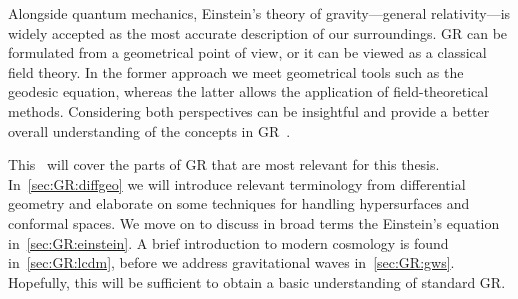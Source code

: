 













Alongside quantum mechanics, Einstein's theory of gravity---general relativity---is widely accepted as the most accurate description of our surroundings. GR can be formulated from a geometrical point of view, or it can be viewed as a classical field theory. In the former approach we meet geometrical tools such as the geodesic equation, whereas the latter allows the application of field-theoretical methods. 
Considering both perspectives can be insightful and provide a better overall understanding of the concepts in GR~\citep{maggioreGravitationalWavesVol2007}.



This~ will cover the parts of GR that are most relevant for this thesis. In~\cref{sec:GR:diffgeo} we will introduce relevant terminology from differential geometry and elaborate on some techniques for handling hypersurfaces and conformal spaces. We move on to discuss in broad terms the Einstein's equation in~\cref{sec:GR:einstein}. A brief introduction to modern cosmology is found in~\cref{sec:GR:lcdm}, before we address gravitational waves in~\cref{sec:GR:gws}. Hopefully, this will be sufficient to obtain a basic understanding of standard GR.





